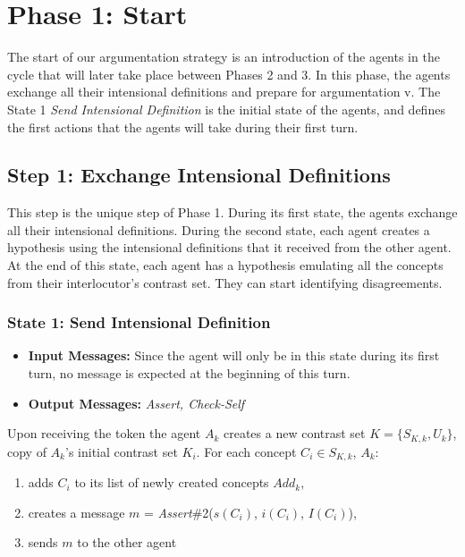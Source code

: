 \section{Phase 1: Start}

The start of our argumentation strategy is an introduction of the agents in the cycle that will later take place between Phases 2 and 3. In this phase, the agents exchange all their intensional definitions and prepare for argumentation v. The State 1 \emph{Send Intensional Definition} is the initial state of the agents, and defines the first actions that the agents will take during their first turn. 

\subsection{Step 1: Exchange Intensional Definitions}

This step is the unique step of Phase 1. During its first state, the agents exchange all their intensional definitions. During the second state, each agent creates a hypothesis using the intensional definitions that it received from the other agent. At the end of this state, each agent has a hypothesis emulating all the concepts from their interlocutor's contrast set. They can start identifying disagreements.

\subsubsection{State 1: Send Intensional Definition}

\begin{itemize}
    \item \textbf{Input Messages:} Since the agent will only be in this state during its first turn, no message is expected at the beginning of this turn.
    \item \textbf{Output Messages:} \emph{Assert, Check-Self}
\end{itemize}
    
Upon receiving the token the agent $A_{k}$ creates a new contrast set $K = \{ S_{K,k}, U_{k} \}$, copy of $A_{k}$'s initial contrast set $K_{i}$. For each concept $C_{i} \in S_{K,k}$, $A_{k}$:

\begin{enumerate}
    \item adds $C_{i}$ to its list of newly created concepts $Add_{k}$,
    \item creates a message $m$ = \emph{Assert}\#2($s(C_{i})$, $i(C_{i})$, $I(C_{i})$),
    \item sends $m$ to the other agent
\end{enumerate}

